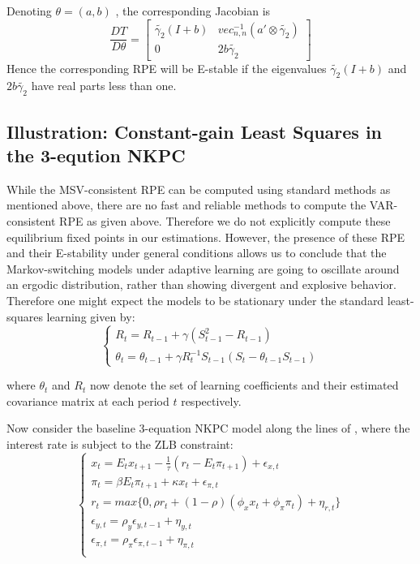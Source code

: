 \documentclass[12pt,reqno]{article}
\numberwithin{equation}{section}
\begin{document}
Denoting $ \theta = (a,b) $ , the corresponding Jacobian is \\

$$
\frac{DT}{ D \theta} = \begin{bmatrix}  \tilde{\gamma_2 } (I+b) & vec^{-1}_{n,n} ( a' \otimes \tilde{\gamma_2}) \\ 0 & 2 b \tilde{\gamma_2}  \end{bmatrix} 
$$
Hence the corresponding RPE will be E-stable if the eigenvalues $\tilde{\gamma_2} (I+b) $ and $ 2 b \tilde{\gamma_2} $ have real parts less than one. \\


\subsection{Illustration: Constant-gain Least Squares in the 3-eqution NKPC}

While the MSV-consistent RPE can be computed using standard methods as mentioned above, there are no fast and reliable methods to compute the VAR-consistent RPE as given above. Therefore we do not explicitly compute these equilibrium fixed points in our estimations. However, the presence of these RPE and their E-stability under general conditions allows us to conclude that the Markov-switching models under adaptive learning are going to oscillate around an ergodic distribution, rather than showing divergent and explosive behavior. Therefore one might expect the models to be stationary under the standard least-squares learning given by: \\


$$
\begin{cases}

R_t = R_{t-1} + \gamma (S_{t-1}^2 - R_{t-1} ) \\
\theta_t = \theta_{t-1} + \gamma R_t^{-1} S_{t-1} (S_t - \theta_{t-1} S_{t-1}) 
\end{cases}
$$

where $\theta_t$ and $R_t$   now denote the set of learning coefficients and their estimated covariance matrix at each period $t$ respectively.  

Now consider the baseline 3-equation NKPC model along the lines of \cite{woodford2013macroeconomic}, where the interest rate is subject to the ZLB constraint: \\

$$
\begin{cases} 
x_t = E_t x_{t+1}  -\frac{1}{\tau}(r_t - E_t \pi_{t+1})+ \epsilon_{x,t} \\
\pi_t = \beta E_t \pi_{t+1} + \kappa x_t + \epsilon_{\pi,t} \\
r_t = max\{ 0, \rho r_t+(1-\rho) (\phi_x x_t + \phi_{\pi} \pi_t )+ \eta_{r,t}\} \\
\epsilon_{y,t} = \rho_y \epsilon_{y,t-1} + \eta_{y,t} \\ 
\epsilon_{\pi,t} = \rho_{\pi} \epsilon_{\pi,t-1} + \eta_{\pi,t} \\
\end{cases} 
$$
\end{document}
